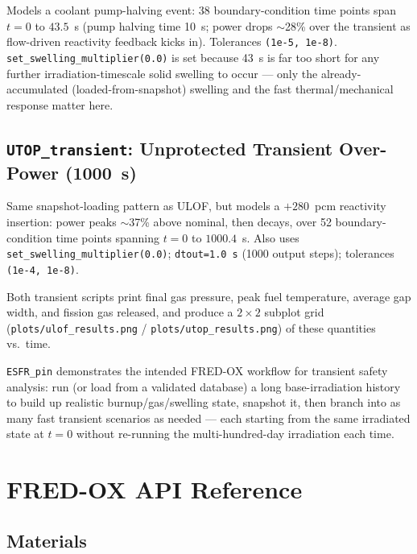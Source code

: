 \documentclass[11pt,a4paper]{article}
\begin{document}
Models a coolant pump-halving event: 38 boundary-condition time points span
$t=0$ to $43.5$~s (pump halving time 10~s; power drops $\sim$28\% over the
transient as flow-driven reactivity feedback kicks in).  Tolerances
\texttt{(1e-5, 1e-8)}.  \texttt{set\_swelling\_multiplier(0.0)} is set
because 43~s is far too short for any further irradiation-timescale solid
swelling to occur --- only the already-accumulated (loaded-from-snapshot)
swelling and the fast thermal/mechanical response matter here.

\subsection{\texttt{UTOP\_transient}: Unprotected Transient Over-Power (1000~s)}

Same snapshot-loading pattern as ULOF, but models a $+280$~pcm reactivity
insertion: power peaks $\sim$37\% above nominal, then decays, over 52
boundary-condition time points spanning $t=0$ to $1000.4$~s. Also uses
\texttt{set\_swelling\_multiplier(0.0)}; \texttt{dtout=1.0~s} (1000 output
steps); tolerances \texttt{(1e-4, 1e-8)}.

\medskip
Both transient scripts print final gas pressure, peak fuel temperature,
average gap width, and fission gas released, and produce a $2\times2$
subplot grid (\texttt{plots/ulof\_results.png} / \texttt{plots/utop\_results.png})
of these quantities vs.\ time.

\begin{infobox}
  \texttt{ESFR\_pin} demonstrates the intended FRED-OX workflow for
  transient safety analysis: run (or load from a validated database) a
  long base-irradiation history to build up realistic burnup/gas/swelling
  state, snapshot it, then branch into as many fast transient scenarios as
  needed --- each starting from the same irradiated state at $t=0$ without
  re-running the multi-hundred-day irradiation each time.
\end{infobox}

\section{FRED-OX API Reference}
\label{sec:api-ox}

\subsection{Materials}
\end{document}
